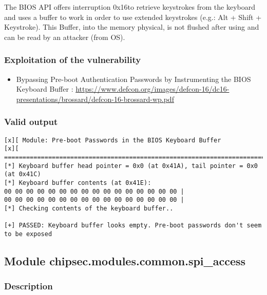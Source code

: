 The BIOS API offers interruption 0x16to retrieve keystrokes from the
keyboard and uses a buffer to work in order to use extended keystrokes
(e.g.: Alt + Shift + Keystroke). This Buffer, into the memory physical,
is not flushed after using and can be read by an attacker (from OS).

\hypertarget{exploitation-of-the-vulnerability}{%
\subsubsection{Exploitation of the
vulnerability}\label{exploitation-of-the-vulnerability}}

\begin{itemize}
\tightlist
\item
  Bypassing Pre-boot Authentication Passwords by Instrumenting the BIOS
  Keyboard Buffer :
  \url{https://www.defcon.org/images/defcon-16/dc16-presentations/brossard/defcon-16-brossard-wp.pdf}
\end{itemize}

\hypertarget{valid-output-15}{%
\subsubsection{Valid output}\label{valid-output-15}}

\begin{verbatim}
[x][ Module: Pre-boot Passwords in the BIOS Keyboard Buffer
[x][ =======================================================================
[*] Keyboard buffer head pointer = 0x0 (at 0x41A), tail pointer = 0x0 (at 0x41C)
[*] Keyboard buffer contents (at 0x41E):
00 00 00 00 00 00 00 00 00 00 00 00 00 00 00 00 |                 
00 00 00 00 00 00 00 00 00 00 00 00 00 00 00 00 |                 
[*] Checking contents of the keyboard buffer..

[+] PASSED: Keyboard buffer looks empty. Pre-boot passwords don't seem to be exposed
\end{verbatim}

\hypertarget{module-chipsec.modules.common.spi_access}{%
\subsection{Module
chipsec.modules.common.spi\_access}\label{module-chipsec.modules.common.spi_access}}

\hypertarget{description-16}{%
\subsubsection{Description}\label{description-16}}

